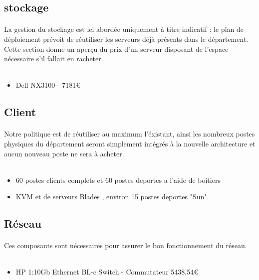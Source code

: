 \subsection{stockage}

\paragraph{} La gestion du stockage est ici abordée uniquement à titre indicatif : le plan de déploiement prévoit de réutiliser les serveurs déjà présents dans le département. Cette section donne un aperçu du prix d'un serveur disposant de l'espace nécessaire s'il fallait en racheter.
\\~
\begin{itemize}
 	\item Dell NX3100 - 7181€
\end{itemize}

\subsection{Client}

\paragraph{} Notre politique est de réutiliser au maximum l'éxistant, ainsi les nombreux postes physiques du département seront simplement intégrés à la nouvelle architecture et aucun nouveau poste ne sera à acheter.
\\~
\begin{itemize}
	\item 60 postes clients complets et 60 postes deportes a l'aide de boitiers
	\item KVM et de serveurs Blades , environ 15 postes deportes "Sun".
\end{itemize}

\subsection{Réseau}

\paragraph{} Ces composants sont nécessaires pour assurer le bon fonctionnement du réseau.
\\~
\begin{itemize}
	\item HP 1:10Gb Ethernet BL-c Switch - Commutateur 5438,54€
\end{itemize}

